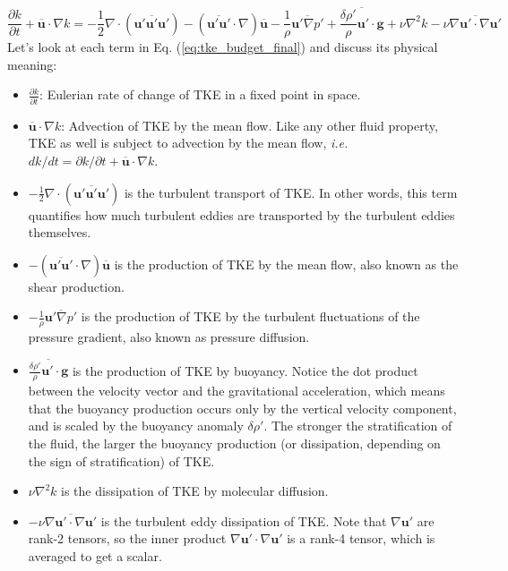 \documentclass[12pt]{article}
\numberwithin{equation}{section}
\numberwithin{figure}{section}
\numberwithin{table}{section}
\begin{document}
\begin{equation}
  \frac{\partial k}{\partial t} + \overline{\mathbf{u}} \cdot \nabla k =
  - \frac{1}{2} \nabla \cdot (\overline{\mathbf{u}' \mathbf{u}' \mathbf{u}'})
  - (\overline{\mathbf{u}' \mathbf{u}'} \cdot \nabla) \overline{\mathbf{u}}
  - \frac{1}{\rho} \overline{\mathbf{u}' \nabla p'}
  + \overline{\frac{\delta \rho'}{\rho} \mathbf{u}' \cdot \mathbf{g}}
  + \nu \nabla^2 k
  - \nu \overline{\nabla \mathbf{u}' \cdot \nabla \mathbf{u}'}
  \label{eq:tke_budget_final}
\end{equation}
Let's look at each term in Eq. (\ref{eq:tke_budget_final}) and discuss its
physical meaning:

\begin{itemize}
  \item $\frac{\partial k}{\partial t}$: Eulerian rate of change of TKE in
  a fixed point in space.

  \item $\overline{\mathbf{u}} \cdot \nabla k$: Advection of TKE by the mean
  flow. Like any other fluid property, TKE as well is subject to advection by
  the mean flow, \textit{i.e.} $dk/dt = \partial k/\partial t + \overline{\mathbf{u}} \cdot \nabla k$.

  \item $-\frac{1}{2} \nabla \cdot (\overline{\mathbf{u}' \mathbf{u}' \mathbf{u}'})$
  is the turbulent transport of TKE. In other words, this term quantifies how
  much turbulent eddies are transported by the turbulent eddies themselves.

  \item $-(\overline{\mathbf{u}' \mathbf{u}'} \cdot \nabla) \overline{\mathbf{u}}$ is the
  production of TKE by the mean flow, also known as the shear production.

  \item $-\frac{1}{\rho} \overline{\mathbf{u}' \nabla p'}$ is the
  production of TKE by the turbulent fluctuations of the pressure gradient,
  also known as pressure diffusion.

  \item $\overline{\frac{\delta \rho'}{\rho} \mathbf{u}' \cdot \mathbf{g}}$
  is the production of TKE by buoyancy. Notice the dot product between the
  velocity vector and the gravitational acceleration, which means that the
  buoyancy production occurs only by the vertical velocity component, and is
  scaled by the buoyancy anomaly $\delta \rho'$. The stronger the stratification
  of the fluid, the larger the buoyancy production (or dissipation, depending on
  the sign of stratification) of TKE.

  \item $\nu \nabla^2 k$ is the dissipation of TKE by molecular diffusion.

  \item $-\nu \overline{\nabla \mathbf{u}' \cdot \nabla \mathbf{u}'}$ is the 
  turbulent eddy dissipation of TKE. Note that $\nabla \mathbf{u}'$ are rank-2
  tensors, so the inner product $\nabla \mathbf{u}' \cdot \nabla \mathbf{u}'$
  is a rank-4 tensor, which is averaged to get a scalar.
\end{itemize}
\end{document}
